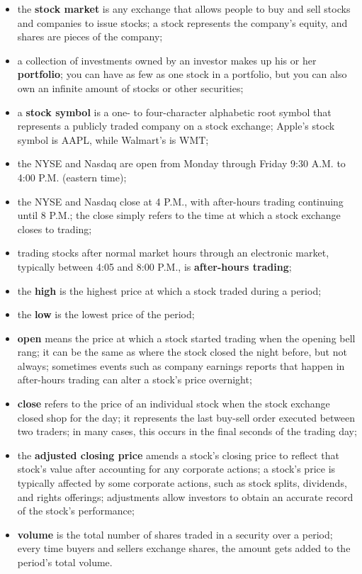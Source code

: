 \begin{itemize}
    \item the \textbf{stock market} is any exchange that allows people to buy 
and sell stocks and companies to issue stocks; a stock represents the company's 
equity, and shares are pieces of the company;
    \item a collection of investments owned by an investor makes up his or her 
\textbf{portfolio}; you can have as few as one stock in a portfolio, but you 
can also own an infinite amount of stocks or other securities;
    \item a \textbf{stock symbol} is a one- to four-character alphabetic root 
symbol that represents a publicly traded company on a stock exchange; Apple's 
stock symbol is AAPL, while Walmart's is WMT;
    \item the NYSE and Nasdaq are open from Monday through Friday 9:30 A.M. to 
4:00 P.M. (eastern time);
    \item the NYSE and Nasdaq close at 4 P.M., with after-hours trading 
continuing until 8 P.M.; the close simply refers to the time at which a stock 
exchange closes to trading;
    \item trading stocks after normal market hours through an electronic market, 
typically between 4:05 and 8:00 P.M., is \textbf{after-hours trading};
    \item the \textbf{high} is the highest price at which a stock traded during 
a period;
    \item the \textbf{low} is the lowest price of the period;
    \item \textbf{open} means the price at which a stock started trading when 
the opening bell rang; it can be the same as where the stock closed the night 
before, but not always; sometimes events such as company earnings reports that 
happen in after-hours trading can alter a stock’s price overnight;
    \item \textbf{close} refers to the price of an individual stock when the 
stock exchange closed shop for the day; it represents the last buy-sell order 
executed between two traders; in many cases, this occurs in the final seconds of 
the trading day;
    \item the \textbf{adjusted closing price} amends a stock's closing price to 
reflect that stock's value after accounting for any corporate actions; a 
stock's price is typically affected by some corporate actions, such as 
stock splits, dividends, and rights offerings; adjustments allow investors to 
obtain an accurate record of the stock's performance;
    \item \textbf{volume} is the total number of shares traded in a security 
over a period; every time buyers and sellers exchange shares, the amount gets 
added to the period’s total volume.
\end{itemize}
